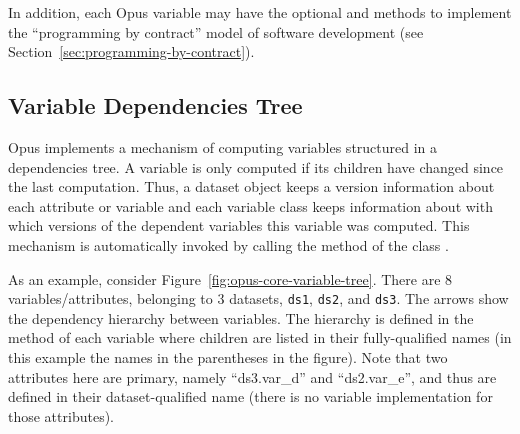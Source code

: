 {In addition, each Opus variable \variablesindex may have the optional  and
 methods to implement the ``programming by contract''
 model of software development (see
Section~\ref{sec:programming-by-contract}).

\subsection{Variable Dependencies Tree}
\label{sec:dependencies-tree}
\variablesindex
%
Opus implements a mechanism of computing variables \variablesindex structured in a
dependencies tree. A variable \variablesindex is only computed if its children have changed
since the last computation. Thus, a dataset \datasetindex object keeps a version information
about each attribute \attributesindex or variable \variablesindex and each variable \variablesindex class keeps information
about with which versions of the dependent variables \variablesindex this variable \variablesindex was
computed. This mechanism is automatically invoked by calling the method
 \variablesindex of the class . \datasetindex

As an example, consider Figure~\ref{fig:opus-core-variable-tree}. There are 8
variables/attributes, \variablesindex\attributesindex belonging to 3 datasets, \datasetindex \verb|ds1|, \verb|ds2|, and
\verb|ds3|.  The arrows show the dependency hierarchy between variables. \variablesindex The
hierarchy is defined in the method  of each variable \variablesindex
where children are listed in their fully-qualified names (in
this example the names in the parentheses in the figure). Note that two
attributes \attributesindex here are primary, namely ``ds3.var_d'' and ``ds2.var_e'', and
thus are defined in their dataset-qualified \datasetindex name (there is no variable \variablesindex
implementation for those attributes). \attributesindex

}
